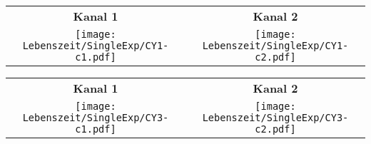 \newpage
\begin{center}
    \begin{tabular}{c c}
        \textbf{Kanal 1} & \textbf{Kanal 2}\\
        \texttt{[image: Lebenszeit/SingleExp/CY1-c1.pdf]}
        &
        \texttt{[image: Lebenszeit/SingleExp/CY1-c2.pdf]}
    \end{tabular}
    \label{image:singleCY1}
    \begin{tabular}{c c}
        \textbf{Kanal 1} & \textbf{Kanal 2}\\
        \texttt{[image: Lebenszeit/SingleExp/CY3-c1.pdf]}
        &
        \texttt{[image: Lebenszeit/SingleExp/CY3-c2.pdf]}
    \end{tabular}
    \label{image:singleCY3}
\end{center}

